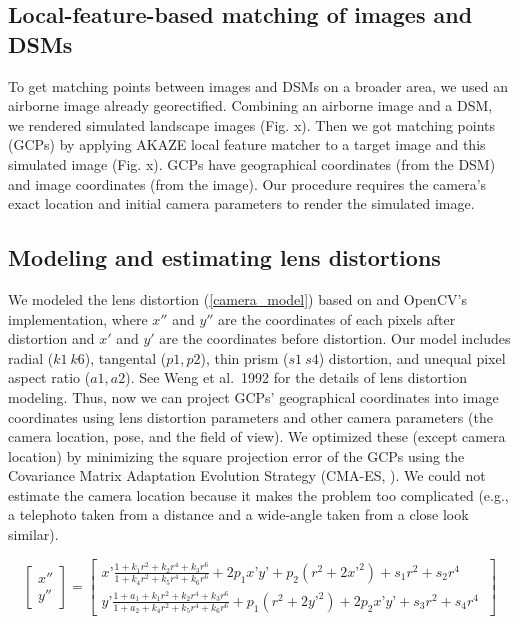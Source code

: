 \documentclass{article}
\begin{document}
\hypertarget{local-feature-based-matching-of-images-and-dsms}{%
\subsection{Local-feature-based matching of images and DSMs}\label{local-feature-based-matching-of-images-and-dsms}}

To get matching points between images and DSMs on a broader area, we used an airborne image already georectified. Combining an airborne image and a DSM, we rendered simulated landscape images (Fig. x). Then we got matching points (GCPs) by applying AKAZE local feature matcher to a target image and this simulated image (Fig. x). GCPs have geographical coordinates (from the DSM) and image coordinates (from the image). Our procedure requires the camera's exact location and initial camera parameters to render the simulated image.

\hypertarget{modeling-and-estimating-lens-distortions}{%
\subsection{Modeling and estimating lens distortions}\label{modeling-and-estimating-lens-distortions}}

We modeled the lens distortion (\ref{camera_model}) based on \cite{Weng1992CameraCalib} and OpenCV's implementation, where \({x}''\) and \({y}''\) are the coordinates of each pixels after distortion and \(x'\) and \(y'\) are the coordinates before distortion. Our model includes radial (\(k1~k6\)), tangental (\(p1, p2\)), thin prism (\(s1~s4\)) distortion, and unequal pixel aspect ratio (\(a1, a2\)). See Weng et al.~1992 for the details of lens distortion modeling. Thus, now we can project GCPs' geographical coordinates into image coordinates using lens distortion parameters and other camera parameters (the camera location, pose, and the field of view). We optimized these (except camera location) by minimizing the square projection error of the GCPs using the Covariance Matrix Adaptation Evolution Strategy (CMA-ES, \cite{Hansen2003CMAES}). We could not estimate the camera location because it makes the problem too complicated (e.g., a telephoto taken from a distance and a wide-angle taken from a close look similar).

\begin{equation}
\label{camera_model}
\begin{bmatrix}
{x}'' \\ 
{y}'' 
\end{bmatrix} 
= 
\begin{bmatrix} 
x’ \frac{1 + k_1 r^2 + k_2 r^4 + k_3 r^6}{1 + k_4 r^2 + k_5 r^4 + k_6 r^6} + 2 p_1 x’ y’ + p_2(r^2 + 2 x’^2) + s_1 r^2 + s_2 r^4 \\ 
y’ \frac{1 + a_1 + k_1 r^2 + k_2 r^4 + k_3 r^6}{1 + a_2 + k_4 r^2 + k_5 r^4 + k_6 r^6} + p_1 (r^2 + 2 y’^2) + 2 p_2 x’ y’ + s_3 r^2 + s_4 r^4 \ \end{bmatrix}
\end{equation}
\end{document}
